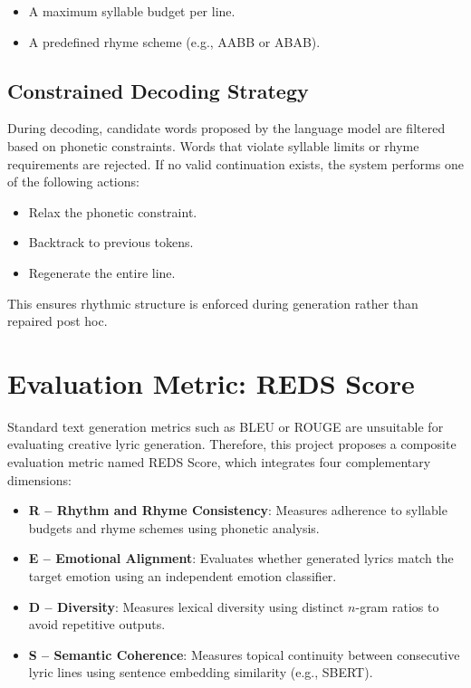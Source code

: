 \documentclass[11pt]{article}
\begin{document}
\begin{itemize}[leftmargin=*]
    \item A maximum syllable budget per line.
    \item A predefined rhyme scheme (e.g., AABB or ABAB).
\end{itemize}

\subsection{Constrained Decoding Strategy}

During decoding, candidate words proposed by the language model are filtered based on phonetic constraints. Words that violate syllable limits or rhyme requirements are rejected. If no valid continuation exists, the system performs one of the following actions:

\begin{itemize}[leftmargin=*]
    \item Relax the phonetic constraint.
    \item Backtrack to previous tokens.
    \item Regenerate the entire line.
\end{itemize}

This ensures rhythmic structure is enforced during generation rather than repaired post hoc.

\section{Evaluation Metric: REDS Score}

Standard text generation metrics such as BLEU or ROUGE are unsuitable for evaluating creative lyric generation. Therefore, this project proposes a composite evaluation metric named REDS Score, which integrates four complementary dimensions:

\begin{itemize}[leftmargin=*]
    \item \textbf{R -- Rhythm and Rhyme Consistency}: Measures adherence to syllable budgets and rhyme schemes using phonetic analysis.
    \item \textbf{E -- Emotional Alignment}: Evaluates whether generated lyrics match the target emotion using an independent emotion classifier.
    \item \textbf{D -- Diversity}: Measures lexical diversity using distinct $n$-gram ratios to avoid repetitive outputs.
    \item \textbf{S -- Semantic Coherence}: Measures topical continuity between consecutive lyric lines using sentence embedding similarity (e.g., SBERT).
\end{itemize}
\end{document}
